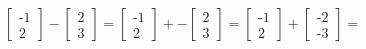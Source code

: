\documentclass[preview]{standalone}
\begin{document}
\begin{align*}
\begin{bmatrix} \text{-}1 \\ 2 \end{bmatrix} - \begin{bmatrix} 2 \\ 3 \end{bmatrix}= \begin{bmatrix} \text{-}1 \\ 2 \end{bmatrix} + - \begin{bmatrix} 2 \\ 3 \end{bmatrix} = \begin{bmatrix} \text{-}1 \\ 2 \end{bmatrix} + \begin{bmatrix} \text{-}2 \\ \text{-}3 \end{bmatrix}=
\end{align*}
\end{document}
